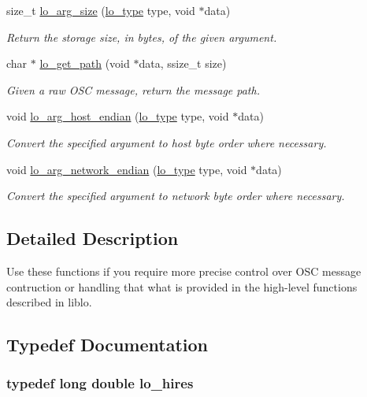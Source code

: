 \begin{DoxyCompactItemize}
size\+\_\+t \hyperlink{group__liblolowlevel_gaf793bbd32346a91d7d680d91ae68d1bd}{lo\+\_\+arg\+\_\+size} (\hyperlink{group__liblo_ga11838c576b0197c255ce805fd7434736}{lo\+\_\+type} type, void $\ast$data)
\begin{DoxyCompactList}\small\item\em Return the storage size, in bytes, of the given argument. \end{DoxyCompactList}\item 
char $\ast$ \hyperlink{group__liblolowlevel_gad38872ce4270bbfed9d62a655a4facab}{lo\+\_\+get\+\_\+path} (void $\ast$data, ssize\+\_\+t size)
\begin{DoxyCompactList}\small\item\em Given a raw O\+S\+C message, return the message path. \end{DoxyCompactList}\item 
void \hyperlink{group__liblolowlevel_ga29fc246595334f29d97d11b0186b17bd}{lo\+\_\+arg\+\_\+host\+\_\+endian} (\hyperlink{group__liblo_ga11838c576b0197c255ce805fd7434736}{lo\+\_\+type} type, void $\ast$data)
\begin{DoxyCompactList}\small\item\em Convert the specified argument to host byte order where necessary. \end{DoxyCompactList}\item 
void \hyperlink{group__liblolowlevel_gad775da1d9ef1feaf1b76077143dc3e96}{lo\+\_\+arg\+\_\+network\+\_\+endian} (\hyperlink{group__liblo_ga11838c576b0197c255ce805fd7434736}{lo\+\_\+type} type, void $\ast$data)
\begin{DoxyCompactList}\small\item\em Convert the specified argument to network byte order where necessary. \end{DoxyCompactList}\end{DoxyCompactItemize}


\subsection{Detailed Description}
Use these functions if you require more precise control over O\+S\+C message contruction or handling that what is provided in the high-\/level functions described in liblo. 

\subsection{Typedef Documentation}
\hypertarget{group__liblolowlevel_ga0062385786b0375d4b6954ba1fb8d52b}{
\subsubsection[{lo\+\_\+hires}]{\setlength{\rightskip}{0pt plus 5cm}typedef long double {\bf lo\+\_\+hires}}}\label{group__liblolowlevel_ga0062385786b0375d4b6954ba1fb8d52b}



